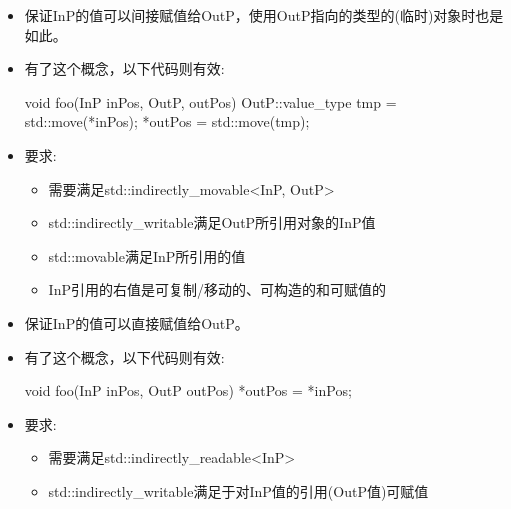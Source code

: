 
\begin{itemize}
\item
保证InP的值可以间接赋值给OutP，使用OutP指向的类型的(临时)对象时也是如此。

\item
有了这个概念，以下代码则有效:

\begin{cpp}
void foo(InP inPos, OutP, outPos) {
	OutP::value_type tmp = std::move(*inPos);
	*outPos = std::move(tmp);
}
\end{cpp}

\item
要求:
\begin{itemize}
\item
需要满足std::indirectly\_movable<InP, OutP>

\item
std::indirectly\_writable满足OutP所引用对象的InP值

\item
std::movable满足InP所引用的值

\item
InP引用的右值是可复制/移动的、可构造的和可赋值的
\end{itemize}
\end{itemize}


\begin{itemize}
\item
保证InP的值可以直接赋值给OutP。

\item
有了这个概念，以下代码则有效:

\begin{cpp}
void foo(InP inPos, OutP outPos) {
	*outPos = *inPos;
}
\end{cpp}

\item
要求:
\begin{itemize}
\item
需要满足std::indirectly\_readable<InP>

\item
std::indirectly\_writable满足于对InP值的引用(OutP值)可赋值
\end{itemize}
\end{itemize}


